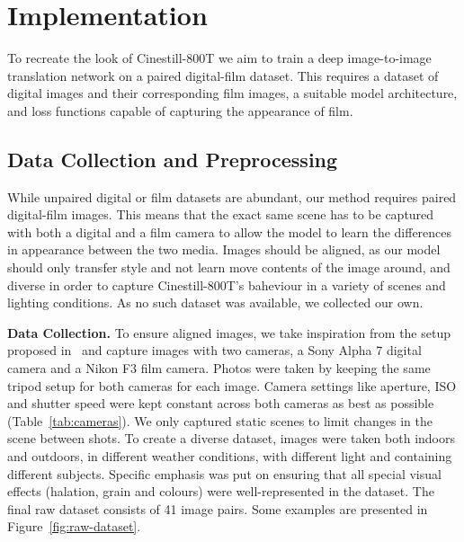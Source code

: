 \section{Implementation}
\label{sec:implementation}


To recreate the look of Cinestill-800T we aim to train a deep image-to-image
translation network on a paired digital-film dataset. This requires a dataset of
digital images and their corresponding film images, a suitable model
architecture, and loss functions capable of capturing the appearance of film.

\subsection{Data Collection and Preprocessing}
\label{subsec:data}
\label{subsubsec:data-collection}

While unpaired digital or film datasets are abundant, our method requires paired digital-film images. This means that the exact same scene has to be captured with both a digital and a film camera to allow the model to learn the differences in appearance between the two media. Images should be aligned, as our model should only transfer style and not learn move contents of the image around, and diverse in order to capture Cinestill-800T's baheviour in a variety of scenes and lighting conditions. As no such dataset was available, we collected our own.

\textbf{Data Collection.} To ensure aligned images, we take inspiration from the setup proposed in~\cite{dslr-quality} and capture images with two cameras, a Sony Alpha 7 digital camera and a Nikon F3 film camera. Photos were taken by keeping the same tripod setup for both cameras for each image. Camera settings like aperture, ISO and shutter speed were kept constant across both cameras as best as possible (Table~\ref{tab:cameras}). We only captured static scenes to limit changes in the scene between shots. To create a diverse dataset, images were taken both indoors and outdoors, in different weather conditions, with different light and containing different subjects. Specific emphasis was put on ensuring that all special visual effects (halation, grain and colours) were well-represented in the dataset. The final raw dataset consists of 41 image pairs. Some examples are presented in Figure~\ref{fig:raw-dataset}. 

